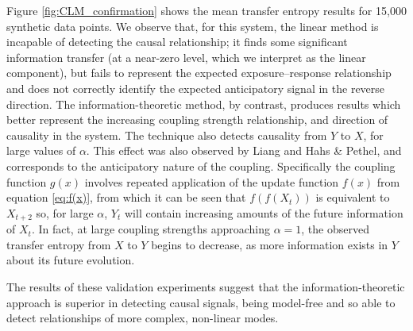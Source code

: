 \documentclass[]{rsos}%
\begin{document}
  Figure \ref{fig:CLM_confirmation} shows the mean transfer entropy results for 15,000 synthetic data points. We observe that, for this system, the linear method is incapable of detecting the causal relationship; it finds some significant information transfer (at a near-zero level, which we interpret as the linear component), but fails to represent the expected exposure–response relationship and does not correctly identify the expected anticipatory signal in the reverse direction. The information-theoretic method, by contrast, produces results which better represent the increasing coupling strength relationship, and direction of causality in the system. The technique also detects causality from $Y$ to $X$, for large values of $\alpha$. This effect was also observed by Liang and Hahs \& Pethel, and corresponds to the anticipatory nature of the coupling. Specifically the coupling function $g(x)$ involves repeated application of the update function $f(x)$ from equation \ref{eq:f(x)}, from which it can be seen that $f(f(X_t))$ is equivalent to $X_{t+2}$ so, for large $\alpha$, $Y_t$ will contain increasing amounts of the future information of $X_t$. In fact, at large coupling strengths approaching $\alpha=1$, the observed transfer entropy from $X$ to $Y$ begins to decrease, as more information exists in $Y$ about its future evolution.

  The results of these validation experiments suggest that the information-theoretic approach is superior in detecting causal signals, being model-free and so able to detect relationships of more complex, non-linear modes.
\end{document}
